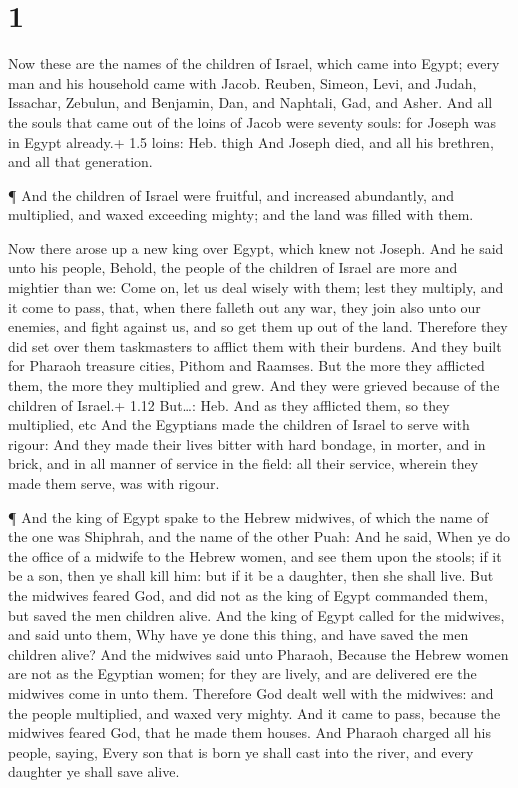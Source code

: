 \hypertarget{section}{%
\section{1}\label{section}}

 Now these are the names of the children of Israel, which
came into Egypt; every man and his household came with Jacob.
 Reuben, Simeon, Levi, and Judah,  Issachar,
Zebulun, and Benjamin,  Dan, and Naphtali, Gad, and Asher.
 And all the souls that came out of the loins of Jacob were
seventy souls: for Joseph was in Egypt already.+ 1.5 loins: Heb. thigh
 And Joseph died, and all his brethren, and all that
generation.

 ¶ And the children of Israel were fruitful, and increased
abundantly, and multiplied, and waxed exceeding mighty; and the land was
filled with them.

 Now there arose up a new king over Egypt, which knew not
Joseph.  And he said unto his people, Behold, the people of
the children of Israel are more and mightier than we:  Come
on, let us deal wisely with them; lest they multiply, and it come to
pass, that, when there falleth out any war, they join also unto our
enemies, and fight against us, and so get them up out of the land.
 Therefore they did set over them taskmasters to afflict
them with their burdens. And they built for Pharaoh treasure cities,
Pithom and Raamses.  But the more they afflicted them, the
more they multiplied and grew. And they were grieved because of the
children of Israel.+ 1.12 But\ldots: Heb. And as they afflicted them, so
they multiplied, etc  And the Egyptians made the children
of Israel to serve with rigour:  And they made their lives
bitter with hard bondage, in morter, and in brick, and in all manner of
service in the field: all their service, wherein they made them serve,
was with rigour.

 ¶ And the king of Egypt spake to the Hebrew midwives, of
which the name of the one was Shiphrah, and the name of the other Puah:
 And he said, When ye do the office of a midwife to the
Hebrew women, and see them upon the stools; if it be a son, then ye
shall kill him: but if it be a daughter, then she shall live.
 But the midwives feared God, and did not as the king of
Egypt commanded them, but saved the men children alive. 
And the king of Egypt called for the midwives, and said unto them, Why
have ye done this thing, and have saved the men children alive?
 And the midwives said unto Pharaoh, Because the Hebrew
women are not as the Egyptian women; for they are lively, and are
delivered ere the midwives come in unto them.  Therefore
God dealt well with the midwives: and the people multiplied, and waxed
very mighty.  And it came to pass, because the midwives
feared God, that he made them houses.  And Pharaoh charged
all his people, saying, Every son that is born ye shall cast into the
river, and every daughter ye shall save alive.

